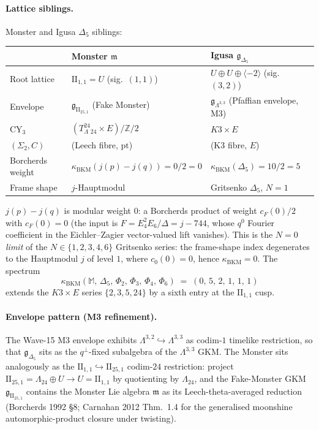 \documentclass[11pt]{article}
\providecommand{\Z}{\mathbb{Z}}
\providecommand{\Lat}{\Lambda}
\providecommand{\Leech}{\Lambda_{24}}
\providecommand{\IIlor}{\mathrm{II}_{25,1}}
\providecommand{\IIonel}{\mathrm{II}_{1,1}}
\providecommand{\gBKM}{\mathfrak{g}}
\providecommand{\mMon}{\mathfrak{m}}
\providecommand{\Mon}{\mathbb{M}}
\providecommand{\kBKM}{\kappa_{\mathrm{BKM}}}
\theoremstyle{plain}
\theoremstyle{definition}
\begin{document}
\paragraph{Lattice siblings.} Monster and Igusa $\Delta_5$ siblings:
\begin{center}
\begin{tabular}{lll}
 & Monster $\mMon$ & Igusa $\gBKM_{\Delta_5}$ \\\hline
Root lattice & $\IIonel=U$ (sig.\ $(1,1)$)
            & $U\oplus U\oplus\langle-2\rangle$ (sig.\ $(3,2)$) \\
Envelope & $\gBKM_{\IIlor}$ (Fake Monster)
         & $\gBKM_{\Lat^{3,3}}$ (Pfaffian envelope, M3) \\
CY$_3$ & $(T^{24}_\Leech\times E)/\Z/2$ & $K3\times E$ \\
$(\Sigma_2,C)$ & (Leech fibre, $\mathrm{pt}$) & (K3 fibre, $E$) \\
Borcherds weight & $\kBKM(j(p){-}j(q))=0/2=0$ & $\kBKM(\Delta_5)=10/2=5$ \\
Frame shape & $j$-Hauptmodul & Gritsenko $\Delta_5$, $N{=}1$ \\
\end{tabular}
\end{center}
$j(p)-j(q)$ is modular weight $0$: a Borcherds product of weight
$c_F(0)/2$ with $c_F(0)=0$ (the input is $F=E_4^2 E_6/\Delta=j-744$,
whose $q^0$ Fourier coefficient in the Eichler--Zagier vector-valued
lift vanishes). This is the \emph{$N=0$ limit} of the
$N\in\{1,2,3,4,6\}$ Gritsenko series: the frame-shape index degenerates
to the Hauptmodul $j$ of level $1$, where $c_0(0)=0$, hence
$\kBKM=0$. The spectrum
\[
  \kBKM(\Mon,\,\Delta_5,\,\Phi_2,\,\Phi_3,\,\Phi_4,\,\Phi_6)
  \;=\;(0,\,5,\,2,\,1,\,1,\,1)
\]
extends the $K3\times E$ series $\{2,3,5,24\}$ by a sixth entry at
the $\IIonel$ cusp.

\paragraph{Envelope pattern (M3 refinement).}
The Wave-15 M3 envelope exhibits
$\Lat^{3,2}\hookrightarrow\Lat^{3,3}$ as codim-$1$ timelike
restriction, so that $\gBKM_{\Delta_5}$ sits as the $q^\perp$-fixed
subalgebra of the $\Lat^{3,3}$ GKM. The Monster sits analogously as
the $\IIonel\hookrightarrow\IIlor$ codim-$24$ restriction: project
$\IIlor=\Leech\oplus U\to U=\IIonel$ by quotienting by $\Leech$, and
the Fake-Monster GKM $\gBKM_{\IIlor}$ contains the Monster Lie
algebra $\mMon$ as its Leech-theta-averaged reduction
(Borcherds 1992 \S 8; Carnahan 2012 Thm.~1.4 for the generalised
moonshine automorphic-product closure under twisting).
\end{document}
